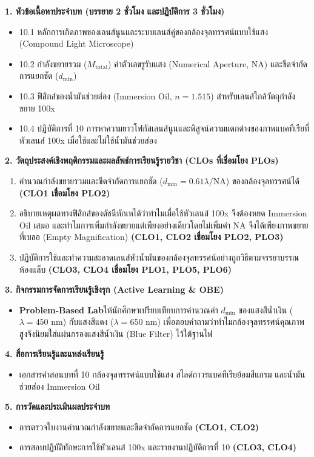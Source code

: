 \cleardoublepage
{}
\begin{planbox}
\noindent\textbf{1. หัวข้อเนื้อหาประจำบท (บรรยาย 2 ชั่วโมง และปฏิบัติการ 3 ชั่วโมง)}
\begin{itemize}
    \item 10.1 หลักการเกิดภาพของเลนส์นูนและระบบเลนส์คู่ของกล้องจุลทรรศน์แบบใช้แสง (Compound Light Microscope)
    \item 10.2 กำลังขยายรวม ($M_{\text{total}}$) ค่าตัวเลขรูรับแสง (Numerical Aperture, $\text{NA}$) และขีดจำกัดการแยกชัด ($d_{\min}$)
    \item 10.3 ฟิสิกส์ของน้ำมันช่วยส่อง (Immersion Oil, $n = 1.515$) สำหรับเลนส์ใกล้วัตถุกำลังขยาย 100x
    \item 10.4 ปฏิบัติการที่ 10 การหาความยาวโฟกัสเลนส์นูนและพิสูจน์ความแตกต่างของภาพแบคทีเรียที่หัวเลนส์ 100x เมื่อใช้และไม่ใช้น้ำมันช่วยส่อง
\end{itemize}

\noindent\textbf{2. วัตถุประสงค์เชิงพฤติกรรมและผลลัพธ์การเรียนรู้รายวิชา (CLOs ที่เชื่อมโยง PLOs)}
\begin{enumerate}
    \item คำนวณกำลังขยายรวมและขีดจำกัดการแยกชัด ($d_{\min} = 0.61\lambda / \text{NA}$) ของกล้องจุลทรรศน์ได้ \textbf{(CLO1 เชื่อมโยง PLO2)}
    \item อธิบายเหตุผลทางฟิสิกส์ของดัชนีหักเหได้ว่าทำไมเมื่อใช้หัวเลนส์ 100x จึงต้องหยด Immersion Oil เสมอ และทำไมการเพิ่มกำลังขยายแต่เพียงอย่างเดียวโดยไม่เพิ่มค่า $\text{NA}$ จึงได้เพียงภาพขยายที่เบลอ (Empty Magnification) \textbf{(CLO1, CLO2 เชื่อมโยง PLO2, PLO3)}
    \item ปฏิบัติการใช้และทำความสะอาดเลนส์หัวน้ำมันของกล้องจุลทรรศน์อย่างถูกวิธีตามจรรยาบรรณห้องแล็บ \textbf{(CLO3, CLO4 เชื่อมโยง PLO1, PLO5, PLO6)}
\end{enumerate}

\noindent\textbf{3. กิจกรรมการจัดการเรียนรู้เชิงรุก (Active Learning \& OBE)}
\begin{itemize}
    \item \textbf{Problem-Based Lab}\quad ให้นักศึกษาเปรียบเทียบการคำนวณค่า $d_{\min}$ ของแสงสีน้ำเงิน ($\lambda = 450\text{ nm}$) กับแสงสีแดง ($\lambda = 650\text{ nm}$) เพื่อตอบคำถามว่าทำไมกล้องจุลทรรศน์คุณภาพสูงจึงนิยมใส่แผ่นกรองแสงสีน้ำเงิน (Blue Filter) ไว้ใต้ฐานไฟ
\end{itemize}

\noindent\textbf{4. สื่อการเรียนรู้และแหล่งเรียนรู้}
\begin{itemize}
    \item เอกสารคำสอนบทที่ 10 กล้องจุลทรรศน์แบบใช้แสง สไลด์ถาวรแบคทีเรียย้อมสีแกรม และน้ำมันช่วยส่อง Immersion Oil
\end{itemize}

\noindent\textbf{5. การวัดและประเมินผลประจำบท}
\begin{itemize}
    \item การตรวจใบงานคำนวณกำลังขยายและขีดจำกัดการแยกชัด \textbf{(CLO1, CLO2)}
    \item การสอบปฏิบัติทักษะการใช้หัวเลนส์ 100x และรายงานปฏิบัติการที่ 10 \textbf{(CLO3, CLO4)}
\end{itemize}
\end{planbox}
